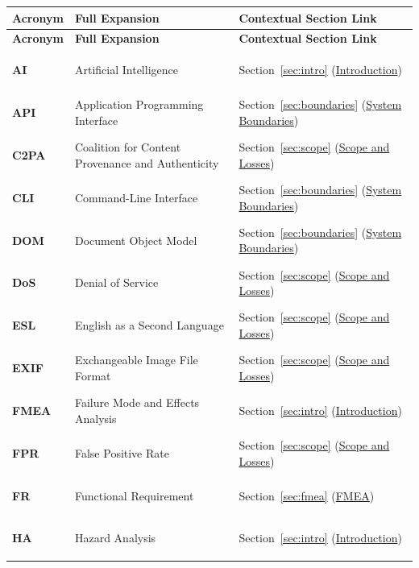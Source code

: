 \documentclass[11pt]{article}
\begin{document}
{\small
\renewcommand{\arraystretch}{0.95}
\begin{tabularx}{\textwidth}{l P{6.4cm} Y}
\caption{Acronyms and Abbreviations} \label{TblHAAcronyms}\\
\toprule
\textbf{Acronym} & \textbf{Full Expansion} & \textbf{Contextual Section Link}\\
\midrule
\endfirsthead
\toprule
\textbf{Acronym} & \textbf{Full Expansion} & \textbf{Contextual Section Link}\\
\midrule
\endhead
\bottomrule
\endfoot
\hypertarget{ha-acr-ai}{\textbf{AI}} & Artificial Intelligence & Section~\ref{sec:intro} (\hyperref[sec:intro]{Introduction})\\
\hypertarget{ha-acr-api}{\textbf{API}} & Application Programming Interface & Section~\ref{sec:boundaries} (\hyperref[sec:boundaries]{System Boundaries})\\
\hypertarget{ha-acr-c2pa}{\textbf{C2PA}} & Coalition for Content Provenance and Authenticity & Section~\ref{sec:scope} (\hyperref[sec:scope]{Scope and Losses})\\
\hypertarget{ha-acr-cli}{\textbf{CLI}} & Command-Line Interface & Section~\ref{sec:boundaries} (\hyperref[sec:boundaries]{System Boundaries})\\
\hypertarget{ha-acr-dom}{\textbf{DOM}} & Document Object Model & Section~\ref{sec:boundaries} (\hyperref[sec:boundaries]{System Boundaries})\\
\hypertarget{ha-acr-dos}{\textbf{DoS}} & Denial of Service & Section~\ref{sec:scope} (\hyperref[sec:scope]{Scope and Losses})\\
\hypertarget{ha-acr-esl}{\textbf{ESL}} & English as a Second Language & Section~\ref{sec:scope} (\hyperref[sec:scope]{Scope and Losses})\\
\hypertarget{ha-acr-exif}{\textbf{EXIF}} & Exchangeable Image File Format & Section~\ref{sec:scope} (\hyperref[sec:scope]{Scope and Losses})\\
\hypertarget{ha-acr-fmea}{\textbf{FMEA}} & Failure Mode and Effects Analysis & Section~\ref{sec:intro} (\hyperref[sec:intro]{Introduction})\\
\hypertarget{ha-acr-fpr}{\textbf{FPR}} & False Positive Rate & Section~\ref{sec:scope} (\hyperref[sec:scope]{Scope and Losses})\\
\hypertarget{ha-acr-fr}{\textbf{FR}} & Functional Requirement & Section~\ref{sec:fmea} (\hyperref[sec:fmea]{FMEA})\\
\hypertarget{ha-acr-ha}{\textbf{HA}} & Hazard Analysis & Section~\ref{sec:intro} (\hyperref[sec:intro]{Introduction})\\

\end{tabularx}}
\end{document}
